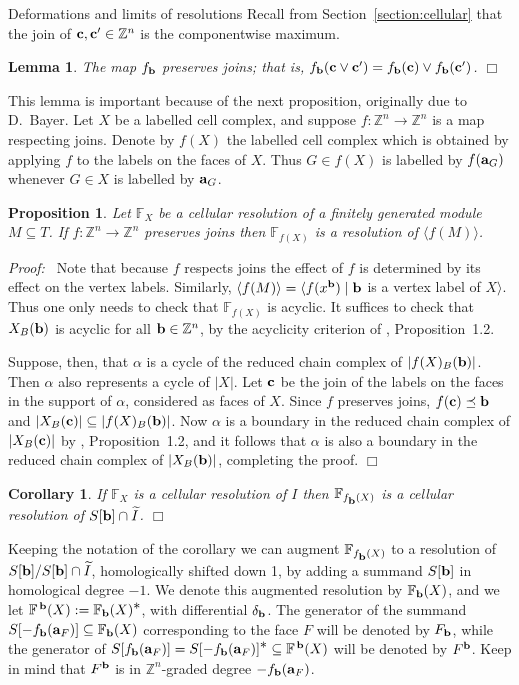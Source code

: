 \documentclass[12pt,leqno]{article}
\newtheorem{lemma}[thm]{Lemma}
\newtheorem{cor}[thm]{Corollary}
\newtheorem{prop}[thm]{Proposition}
\def\<{{\langle}}
\def\>{{\rangle}}
\def\Ast{{\textstyle \ast}}
\def\aa{{{\rm \bf a}}}
\def\bb{{{\rm \bf b}}}
\def\cc{{{\rm \bf c}}}
\def\FF{{\mathbb F}}
\def\ZZ{{\mathbb Z}}
\begin{document}
\begin{section}{Deformations and limits of resolutions}
Recall from Section~\ref{section:cellular} that the join of $\cc, \cc'
\in \ZZ^n$ is the componentwise maximum.
\begin{lemma} \label{lemma:joins}
The map $f_\bb$ preserves joins; that is, $f_\bb(\cc \vee \cc') =
f_\bb(\cc) \vee f_\bb(\cc')$. \hfill $\Box$
\end{lemma}
This lemma is important because of the next proposition, originally due
to D.\ Bayer.  Let $X$ be a labelled cell complex, and suppose $f \colon
\ZZ^n \to \ZZ^n$ is a map respecting joins.  Denote by $f(X)$ the
labelled cell complex which is obtained by applying $f$ to the labels on
the faces of $X$.  Thus $G \in f(X)$ is labelled by $f(\aa_G)$ whenever
$G \in X$ is labelled by $\aa_G$.
\begin{prop} \label{prop:joins}
Let $\FF_X$ be a cellular resolution of a finitely generated module $M
\subseteq T$.  If $f \colon \ZZ^n \to \ZZ^n$ preserves joins then
$\FF_{f(X)}$ is a resolution of $\<f(M)\>$.
\end{prop}
{\it Proof:\ } Note that because $f$ respects joins the effect of $f$ is
determined by its effect on the vertex labels.  Similarly, $\<f(M)\> =
\<f(x^\bb) \mid \bb$ is a vertex label of $X\>$.  Thus one only needs to
check that $\FF_{f(X)}$ is acyclic.  It suffices to check that $X_B(\bb)$
is acyclic for all $\bb \in \ZZ^n$, by the acyclicity criterion of
\cite{BS}, Proposition~1.2.

Suppose, then, that $\alpha$ is a cycle of the reduced chain complex of
$|f(X)_B(\bb)|$.  Then $\alpha$ also represents a cycle of $|X|$.  Let
$\cc$ be the join of the labels on the faces in the support of $\alpha$,
considered as faces of $X$.  Since $f$ preserves joins, $f(\cc) \preceq
\bb$ and $|X_B(\cc)| \subseteq |f(X)_B(\bb)|$.  Now $\alpha$ is a
boundary in the reduced chain complex of $|X_B(\cc)|$ by \cite{BS},
Proposition~1.2, and it follows that $\alpha$ is also a boundary in the
reduced chain complex of $|X_B(\bb)|$, completing the proof.
%
\hfill
$\Box$
\begin{cor} \label{cor:fbX=SbI}
If $\FF_X$ is a cellular resolution of $I$ then $\FF_{f_{ \scriptstyle
\bb }(X)}$ is a cellular resolution of $S[\bb] \cap \widetilde{I}$.
\hfill $\Box$
\end{cor}

Keeping the notation of the corollary we can augment
$\FF_{f_{\scriptstyle \bb}(X)}$ to a resolution of $S[\bb]/S[\bb] \cap
\widetilde{I}$, homologically shifted down 1, by adding a summand
$S[\bb]$ in homological degree $-1$.  We denote this augmented resolution
by $\FF_\bb(X)$, and we let $\FF^{\,\bb}(X) := \FF_\bb(X)^\Ast$, with
differential $\delta_\bb$.  The generator of the summand
$S[-f_\bb(\aa_F)] \subseteq \FF_\bb(X)$ corresponding to the face $F$
will be denoted by $F_\bb$, while the generator of $S[f_\bb(\aa_F)] =
S[-f_\bb(\aa_F)]^\Ast \subseteq \FF^{\,\bb}(X)$ will be denoted by
$F^\bb$.  Keep in mind that $F^\bb$ is in $\ZZ^n$-graded degree
$-f_\bb(\aa_F)$.


\end{section}
\end{document}
